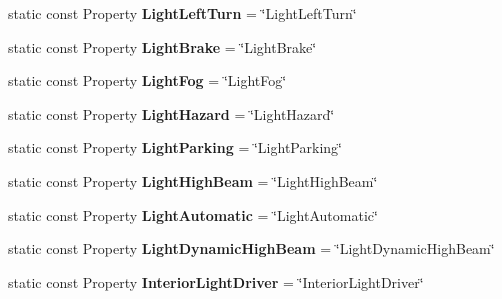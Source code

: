 \begin{DoxyCompactItemize}
\item 
\hypertarget{classVehicleProperty_a4430db4d7c36d7d047766d88f9fc977c}{static const Property {\bfseries Light\-Left\-Turn} = \char`\"{}Light\-Left\-Turn\char`\"{}}\label{classVehicleProperty_a4430db4d7c36d7d047766d88f9fc977c}

\item 
\hypertarget{classVehicleProperty_aa4f2ae234bd0d045b95cf9980e980dd5}{static const Property {\bfseries Light\-Brake} = \char`\"{}Light\-Brake\char`\"{}}\label{classVehicleProperty_aa4f2ae234bd0d045b95cf9980e980dd5}

\item 
\hypertarget{classVehicleProperty_a6eb38fc244331a26b487f7f9beb69b0c}{static const Property {\bfseries Light\-Fog} = \char`\"{}Light\-Fog\char`\"{}}\label{classVehicleProperty_a6eb38fc244331a26b487f7f9beb69b0c}

\item 
\hypertarget{classVehicleProperty_a0d3992f2e0e50bb74baa5e670f6111f0}{static const Property {\bfseries Light\-Hazard} = \char`\"{}Light\-Hazard\char`\"{}}\label{classVehicleProperty_a0d3992f2e0e50bb74baa5e670f6111f0}

\item 
\hypertarget{classVehicleProperty_a144920830af1df5a59433f98ebd29504}{static const Property {\bfseries Light\-Parking} = \char`\"{}Light\-Parking\char`\"{}}\label{classVehicleProperty_a144920830af1df5a59433f98ebd29504}

\item 
\hypertarget{classVehicleProperty_acce36f505d4b0233c753f0d5f568e255}{static const Property {\bfseries Light\-High\-Beam} = \char`\"{}Light\-High\-Beam\char`\"{}}\label{classVehicleProperty_acce36f505d4b0233c753f0d5f568e255}

\item 
\hypertarget{classVehicleProperty_a50b5b2d3b9a2f75d778735520b5c290d}{static const Property {\bfseries Light\-Automatic} = \char`\"{}Light\-Automatic\char`\"{}}\label{classVehicleProperty_a50b5b2d3b9a2f75d778735520b5c290d}

\item 
\hypertarget{classVehicleProperty_a0c94ca523d1feb5dcb53eb050006ecd0}{static const Property {\bfseries Light\-Dynamic\-High\-Beam} = \char`\"{}Light\-Dynamic\-High\-Beam\char`\"{}}\label{classVehicleProperty_a0c94ca523d1feb5dcb53eb050006ecd0}

\item 
\hypertarget{classVehicleProperty_a16b99ec2210fd4ca509a00e59b80f8c0}{static const Property {\bfseries Interior\-Light\-Driver} = \char`\"{}Interior\-Light\-Driver\char`\"{}}\label{classVehicleProperty_a16b99ec2210fd4ca509a00e59b80f8c0}


\end{DoxyCompactItemize}
